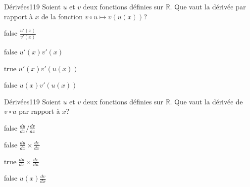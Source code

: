         	\begin{question}{25}{Dérivées}{1}{19}
				Soient $u$ et $v$ deux fonctions définies sur $\mathbb{R}$. Que vaut la dérivée par rapport à $x$ de la fonction $v\circ u \mapsto v(u(x))$?
            \end{question}
            \begin{reponses}
            	\item[false] $\frac{u'(x)}{v'(x)}$
            	\item[false] $u'(x)v'(x)$
                \item[true] $u'(x)v'(u(x))$
                \item[false] $u(x)v'(u(x))$
            \end{reponses}
        	\begin{question}{25}{Dérivées}{1}{19}
				Soient $u$ et $v$ deux fonctions définies sur $\mathbb{R}$. Que vaut la dérivée de $v \circ u$ par rapport à $x$?
            \end{question}
            \begin{reponses}
            	\item[false] $\frac{du}{dx}/\frac{dv}{dx}$
            	\item[false] $\frac{du}{dx}\times \frac{dv}{dx}$
                \item[true] $\frac{du}{dx}\times \frac{dv}{du}$
                \item[false] $u(x)\frac{dv}{dx}$
            \end{reponses}
